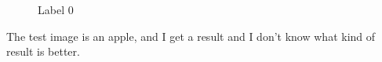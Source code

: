 \documentclass[letterpaper]{polythesis}
\begin{document}
\begin{figure}[htbp]
  \centering
  \caption{Label 0}
  \label{fig:result 0.1} %
\end{figure}

The test image is an apple, and I get a result and I don't know what kind of
result is better.

\backmatter
\end{document}
